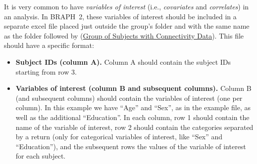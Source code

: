 \documentclass[justified]{tufte-handout}
\begin{document}
It is very common to have \emph{variables of interest} (i.e., \emph{covariates} and \emph{correlates}) in an analysis. In BRAPH~2, these variables of interest should be included in a separate excel file placed just outside the group's folder and with the same name as the folder followed by  (\href{https://github.com/braph-software/BRAPH-2/tree/develop/tutorials/general/tut_gr_con}{Group of Subjects with Connectivity Data}).
This file should have a specific format:
\begin{itemize}

\item {\bf Subject IDs (column A).}
Column A should contain the subject IDs starting from row 3.

\item {\bf Variables of interest (column B and subsequent columns).}
Column B (and subsequent columns) should contain the variables of interest (one per column). 
In this example we have ``Age'' and ``Sex'', as in the example file, as well as the additional ``Education''.
In each column, row 1 should contain the name of the variable of interest, row 2 should contain the categories separated by a return (only for categorical variables of interest, like ``Sex'' and ``Education''), and the subsequent rows the values of the variable of interest for each subject.

\end{itemize}	
\end{document}

